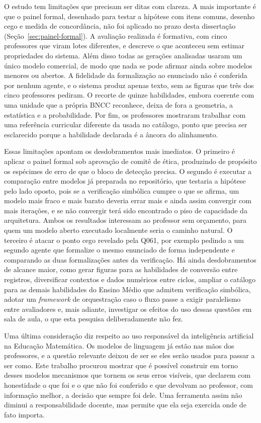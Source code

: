 O estudo tem limitações que precisam ser ditas com clareza. A mais importante é que o painel formal,
desenhado para testar a hipótese com itens comuns, desenho cego e medida de concordância, não foi
aplicado no prazo desta dissertação (Seção~\ref{sec:painel-formal}). A avaliação realizada é formativa,
com cinco professores que viram lotes diferentes, e descreve o que aconteceu sem estimar propriedades
do sistema. Além disso todas as gerações analisadas usaram um único modelo comercial, de modo que nada
se pode afirmar ainda sobre modelos menores ou abertos. A fidelidade da formalização ao enunciado não é
conferida por nenhum agente, e o sistema produz apenas texto, sem as figuras que três dos cinco
professores pediram. O recorte de quinze habilidades, embora coerente com uma unidade que a própria
BNCC reconhece, deixa de fora a geometria, a estatística e a probabilidade. Por fim, os professores
mostraram trabalhar com uma referência curricular diferente da usada no catálogo, ponto que precisa ser
esclarecido porque a habilidade declarada é a âncora do alinhamento.

Essas limitações apontam os desdobramentos mais imediatos. O primeiro é aplicar o painel formal sob
aprovação de comitê de ética, produzindo de propósito os espécimes de erro de que o bloco de detecção
precisa. O segundo é executar a comparação entre modelos já preparada no repositório, que testaria a
hipótese pelo lado oposto, pois se a verificação simbólica cumpre o que se afirma, um modelo mais fraco
e mais barato deveria errar mais e ainda assim convergir com mais iterações, e se não convergir terá
sido encontrado o piso de capacidade da arquitetura. Ambos os resultados interessam ao professor sem
orçamento, para quem um modelo aberto executado localmente seria o caminho natural. O terceiro é
atacar o ponto cego revelado pela Q061, por exemplo pedindo a um segundo agente que formalize o mesmo
enunciado de forma independente e comparando as duas formalizações antes da verificação. Há ainda
desdobramentos de alcance maior, como gerar figuras para as habilidades de conversão entre registros,
diversificar contextos e dados numéricos entre ciclos, ampliar o catálogo para as demais habilidades
do Ensino Médio que admitem verificação simbólica, adotar um \emph{framework} de orquestração caso o
fluxo passe a exigir paralelismo entre avaliadores e, mais adiante, investigar os efeitos do uso
dessas questões em sala de aula, o que esta pesquisa deliberadamente não fez.

Uma última consideração diz respeito ao uso responsável da inteligência artificial na Educação
Matemática. Os modelos de linguagem já estão nas mãos dos professores, e a questão relevante deixou de
ser se eles serão usados para passar a ser como. Este trabalho procurou mostrar que é possível
construir em torno desses modelos mecanismos que tornem os seus erros visíveis, que declarem com
honestidade o que foi e o que não foi conferido e que devolvam ao professor, com informação melhor, a
decisão que sempre foi dele. Uma ferramenta assim não diminui a responsabilidade docente, mas permite
que ela seja exercida onde de fato importa.
